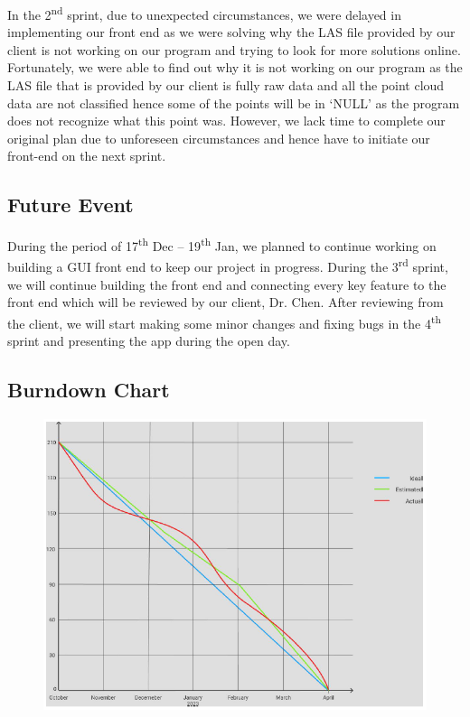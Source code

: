 \documentclass[a4paper, 12pt]{article}
\begin{document}
In the 2\textsuperscript{nd} sprint, due to unexpected circumstances, we were delayed in implementing our front end as we were solving why the LAS file provided by our client is not working on our program and trying to look for more solutions online. Fortunately, we were able to find out why it is not working on our program as the LAS file that is provided by our client is fully raw data and all the point cloud data are not classified hence some of the points will be in ‘NULL’ as the program does not recognize what this point was. However, we lack time to complete our original plan due to unforeseen circumstances and hence have to initiate our front-end on the next sprint.

\subsection{Future Event}

During the period of 17\textsuperscript{th} Dec – 19\textsuperscript{th} Jan, we planned to continue working on building a GUI front end to keep our project in progress. During the 3\textsuperscript{rd} sprint, we will continue building the front end and connecting every key feature to the front end which will be reviewed by our client, Dr. Chen. After reviewing from the client, we will start making some minor changes and fixing bugs in the 4\textsuperscript{th} sprint and presenting the app during the open day.

\subsection{Burndown Chart}

\begin{figure}[H]
    \centering
    \includegraphics[width=\textwidth]{Images/06.png}
\end{figure}
\end{document}
